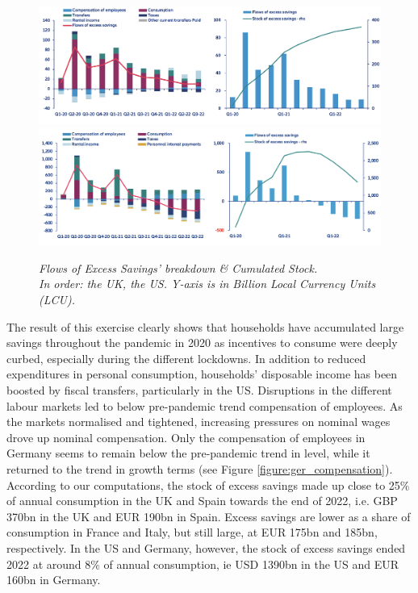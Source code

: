 \begin{figure}[H]
    \centering
    \caption{\textit{Flows of Excess Savings’ breakdown \& Cumulated Stock. \\ In order: the UK, the US. Y-axis is in Billion Local Currency Units (LCU).}}
    \includegraphics[width=.9\textwidth]{Core/1.Savings/img/xUK.png}
    \includegraphics[width=.92\textwidth]{Core/1.Savings/img/xUS2.png}
    \label{figure:Flows2}
\end{figure}

The result of this exercise clearly shows that households have accumulated large savings throughout the pandemic in 2020 as incentives to consume were deeply curbed, especially during the different lockdowns. 
In addition to reduced expenditures in personal consumption, households’ disposable income has been boosted by fiscal transfers, particularly in the US. 
Disruptions in the different labour markets led to below pre-pandemic trend compensation of employees. As the markets normalised and tightened, increasing pressures on nominal wages drove up nominal compensation. 
Only the compensation of employees in Germany seems to remain below the pre-pandemic trend in level, while it returned to the trend in growth terms (see Figure \ref{figure:ger_compensation}). 
According to our computations, the stock of excess savings made up close to 25\% of annual consumption in the UK and Spain towards the end of 2022, i.e. GBP 370bn in the UK and EUR 190bn in Spain. 
Excess savings are lower as a share of consumption in France and Italy, but still large, at EUR 175bn and 185bn, respectively. 
In the US and Germany, however, the stock of excess savings ended 2022 at around 8\% of annual consumption, ie USD 1390bn in the US and EUR 160bn in Germany.

